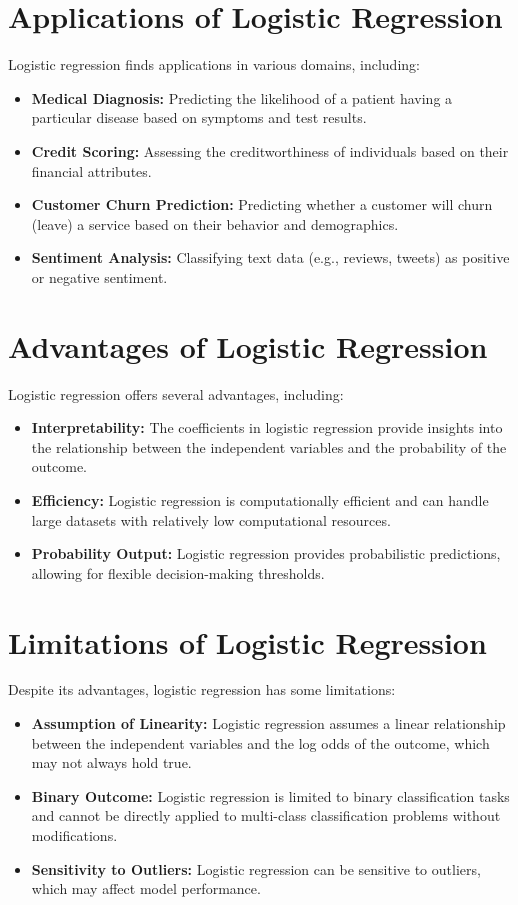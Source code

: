 \documentclass{article}
\begin{document}
\section{Applications of Logistic Regression}
Logistic regression finds applications in various domains, including:
\begin{itemize}
    \item \textbf{Medical Diagnosis:} Predicting the likelihood of a patient having a particular disease based on symptoms and test results.
    \item \textbf{Credit Scoring:} Assessing the creditworthiness of individuals based on their financial attributes.
    \item \textbf{Customer Churn Prediction:} Predicting whether a customer will churn (leave) a service based on their behavior and demographics.
    \item \textbf{Sentiment Analysis:} Classifying text data (e.g., reviews, tweets) as positive or negative sentiment.
\end{itemize}

\section{Advantages of Logistic Regression}
Logistic regression offers several advantages, including:
\begin{itemize}
    \item \textbf{Interpretability:} The coefficients in logistic regression provide insights into the relationship between the independent variables and the probability of the outcome.
    \item \textbf{Efficiency:} Logistic regression is computationally efficient and can handle large datasets with relatively low computational resources.
    \item \textbf{Probability Output:} Logistic regression provides probabilistic predictions, allowing for flexible decision-making thresholds.
\end{itemize}

\section{Limitations of Logistic Regression}
Despite its advantages, logistic regression has some limitations:
\begin{itemize}
    \item \textbf{Assumption of Linearity:} Logistic regression assumes a linear relationship between the independent variables and the log odds of the outcome, which may not always hold true.
    \item \textbf{Binary Outcome:} Logistic regression is limited to binary classification tasks and cannot be directly applied to multi-class classification problems without modifications.
    \item \textbf{Sensitivity to Outliers:} Logistic regression can be sensitive to outliers, which may affect model performance.
\end{itemize}
\end{document}
